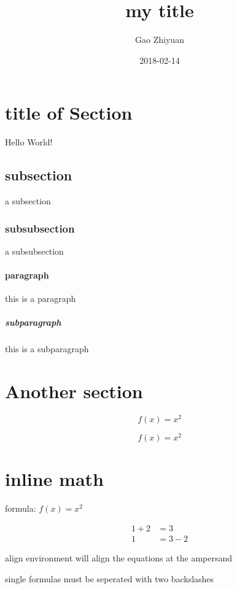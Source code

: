 \documentclass{article}
\title{my title}
\date{2018-02-14}
\author{Gao Zhiyuan}
\begin{document}
  \maketitle

  \section{title of Section}
  Hello World!
  \subsection{subsection}
  a subsection
  \subsubsection{subsubsection}
  a subsubsection 
  \paragraph{paragraph}
  this is a paragraph
  \subparagraph{subparagraph}
  this is a subparagraph

  \section{Another section}

  \begin{equation}
	  f(x) = x^2
  \end{equation}

\begin{equation*}	%
	  f(x) = x^2
  \end{equation*}

  \section{inline math}

  formula: $f(x) = x^2$

  \begin{align*}
	  1 + 2 &= 3 \\ 
	  1 &= 3 - 2
  \end{align*}


  align environment will align the equations at the ampersand 



  single formulas must be seperated with two backslashes
\end{document}
